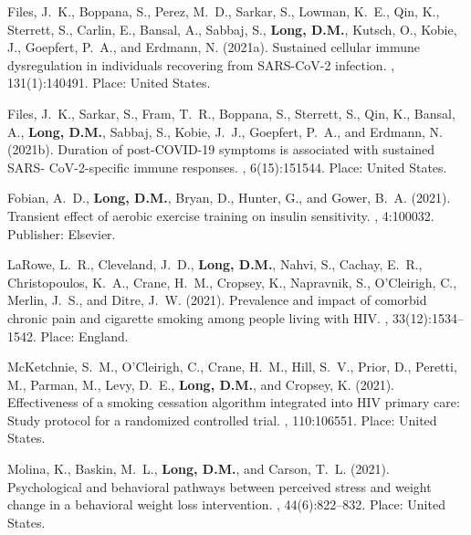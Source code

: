 \begin{thebibliography}{}
Files, J.~K., Boppana, S., Perez, M.~D., Sarkar, S., Lowman, K.~E., Qin, K.,
  Sterrett, S., Carlin, E., Bansal, A., Sabbaj, S., \textbf{Long, D.M.}, Kutsch, O.,
  Kobie, J., Goepfert, P.~A., and Erdmann, N. (2021a).
\newblock Sustained cellular immune dysregulation in individuals recovering
  from {SARS}-{CoV}-2 infection.
, 131(1):140491.
\newblock Place: United States.

Files, J.~K., Sarkar, S., Fram, T.~R., Boppana, S., Sterrett, S., Qin, K.,
  Bansal, A., \textbf{Long, D.M.}, Sabbaj, S., Kobie, J.~J., Goepfert, P.~A., and
  Erdmann, N. (2021b).
\newblock Duration of post-{COVID}-19 symptoms is associated with sustained
  {SARS}- {CoV}-2-specific immune responses.
, 6(15):151544.
\newblock Place: United States.

Fobian, A.~D., \textbf{Long, D.M.}, Bryan, D., Hunter, G., and Gower, B.~A. (2021).
\newblock Transient effect of aerobic exercise training on insulin sensitivity.
, 4:100032.
\newblock Publisher: Elsevier.

LaRowe, L.~R., Cleveland, J.~D., \textbf{Long, D.M.}, Nahvi, S., Cachay, E.~R.,
  Christopoulos, K.~A., Crane, H.~M., Cropsey, K., Napravnik, S., O'Cleirigh,
  C., Merlin, J.~S., and Ditre, J.~W. (2021).
\newblock Prevalence and impact of comorbid chronic pain and cigarette smoking
  among people living with {HIV}.
, 33(12):1534--1542.
\newblock Place: England.

McKetchnie, S.~M., O'Cleirigh, C., Crane, H.~M., Hill, S.~V., Prior, D.,
  Peretti, M., Parman, M., Levy, D.~E., \textbf{Long, D.M.}, and Cropsey, K. (2021).
\newblock Effectiveness of a smoking cessation algorithm integrated into {HIV}
  primary care: {Study} protocol for a randomized controlled trial.
, 110:106551.
\newblock Place: United States.

Molina, K., Baskin, M.~L., \textbf{Long, D.M.}, and Carson, T.~L. (2021).
\newblock Psychological and behavioral pathways between perceived stress and
  weight change in a behavioral weight loss intervention.
, 44(6):822--832.
\newblock Place: United States.


\end{thebibliography}
